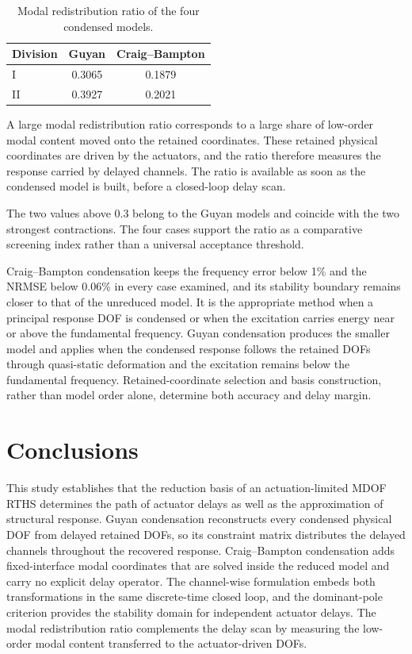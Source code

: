 \documentclass[a4paper,fleqn,review,12pt]{cas-sc}
\numberwithin{equation}{section}
\begin{document}
\begin{table}[htbp]
  \centering
  \caption{Modal redistribution ratio of the four condensed models.}
  \label{tab:energy}
  \begin{tabular}{lcc}
    \toprule
    Division & Guyan & Craig--Bampton\\
    \midrule
    I & 0.3065 & 0.1879\\
    II & 0.3927 & 0.2021\\
    \bottomrule
  \end{tabular}
\end{table}

A large modal redistribution ratio corresponds to a large share of low-order modal content moved onto the retained coordinates. These retained physical coordinates are driven by the actuators, and the ratio therefore measures the response carried by delayed channels. The ratio is available as soon as the condensed model is built, before a closed-loop delay scan.

The two values above 0.3 belong to the Guyan models and coincide with the two strongest contractions. The four cases support the ratio as a comparative screening index rather than a universal acceptance threshold.

Craig--Bampton condensation keeps the frequency error below 1\% and the NRMSE below 0.06\% in every case examined, and its stability boundary remains closer to that of the unreduced model. It is the appropriate method when a principal response DOF is condensed or when the excitation carries energy near or above the fundamental frequency. Guyan condensation produces the smaller model and applies when the condensed response follows the retained DOFs through quasi-static deformation and the excitation remains below the fundamental frequency. Retained-coordinate selection and basis construction, rather than model order alone, determine both accuracy and delay margin.

\section{Conclusions}\label{sec6}

This study establishes that the reduction basis of an actuation-limited MDOF RTHS determines the path of actuator delays as well as the approximation of structural response. Guyan condensation reconstructs every condensed physical DOF from delayed retained DOFs, so its constraint matrix distributes the delayed channels throughout the recovered response. Craig--Bampton condensation adds fixed-interface modal coordinates that are solved inside the reduced model and carry no explicit delay operator. The channel-wise formulation embeds both transformations in the same discrete-time closed loop, and the dominant-pole criterion provides the stability domain for independent actuator delays. The modal redistribution ratio complements the delay scan by measuring the low-order modal content transferred to the actuator-driven DOFs.
\end{document}
